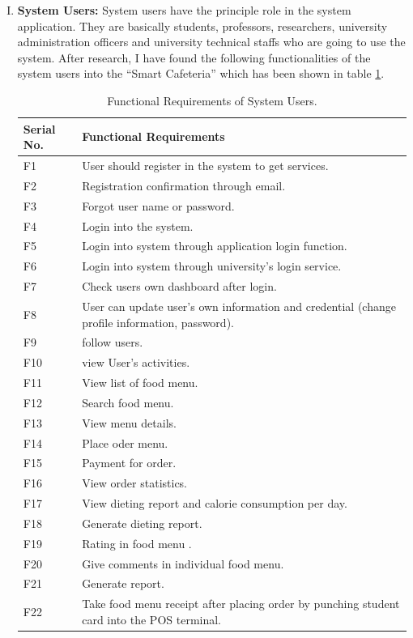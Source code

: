 \begin{enumerate}[(I)]
\item \textbf{System Users:} System users have the principle role in the system
application. They are basically students, professors, researchers, university
administration officers and university technical staffs who are going to use the
system. After research, I have found the following functionalities of the system
users into the ``Smart Cafeteria'' which has been shown in table
\ref{tab:FRSystemUsers}.

\begin{table}[h!t]
\centering
 \begin{tabular}{| p{2cm} | p{10cm} |}
    \hline
    Serial No. & Functional Requirements \\ \hline
    F1 & User should register in the system to get services. \\ \hline
    F2 & Registration confirmation through email. \\ \hline
    F3 & Forgot user name or password. \\ \hline
    F4 & Login into the system. \\ \hline 
  	F5 & Login into system through application login function. \\ \hline 
    F6 & Login into system through university's login service. \\ \hline 
    F7 & Check users own dashboard after login. \\ \hline 
 	F8 & User can update user's own information and credential (change profile information, password). \\ \hline
 	F9 & follow users. \\ \hline 
 	F10 & view User's activities. \\ \hline 
 	F11 & View list of food menu. \\ \hline 
 	F12 & Search food menu. \\ \hline 
 	F13 & View menu details. \\ \hline 
 	F14 & Place oder menu. \\ \hline 
  	F15 & Payment for order. \\ \hline 
   	F16 & View order statistics. \\ \hline
   	F17 & View dieting report and calorie consumption per day. \\ \hline
   	F18 & Generate dieting report. \\ \hline
   	F19 & Rating in food menu . \\ \hline
   	F20 & Give comments in individual food menu. \\ \hline
   	F21 & Generate report. \\ \hline 
   	F22 & Take food menu receipt after placing order by punching student card into the POS terminal. \\ \hline 
    \end{tabular}
 \caption{Functional Requirements of System Users.}
\label{tab:FRSystemUsers}
\end{table}


\end{enumerate}

